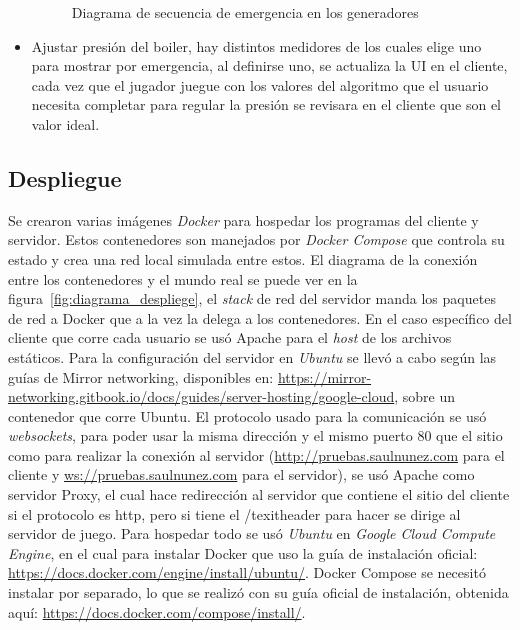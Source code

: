 \begin{itemize}
\begin{figure}[h]
            \caption{Diagrama de secuencia de emergencia en los generadores}
            \label{fig:diagrama_secuencia_generadores}
        \end{figure}
    \item Ajustar presión del boiler, hay distintos medidores de los cuales elige uno para mostrar por emergencia, al definirse uno, se actualiza la UI en el cliente, cada vez que el jugador juegue con los valores del algoritmo que el usuario necesita completar para regular la presión se revisara en el cliente que son el valor ideal.
\end{itemize}

\subsection{Despliegue}
Se crearon varias imágenes \textit{Docker} para hospedar los programas del cliente y servidor. Estos contenedores son manejados por \textit{Docker Compose} que controla su estado y crea una red local simulada entre estos. El diagrama de la conexión entre los contenedores y el mundo real se puede ver en la figura~\ref{fig:diagrama_despliege}, el \textit{stack} de red del servidor manda los paquetes de red a Docker que a la vez la delega a los contenedores.
En el caso específico del cliente que corre cada usuario se usó Apache para el \textit{host} de los archivos estáticos.
Para la configuración del servidor en \textit{Ubuntu} se llevó a cabo según las guías de Mirror networking, disponibles en: \url{https://mirror-networking.gitbook.io/docs/guides/server-hosting/google-cloud}, sobre un contenedor que corre Ubuntu.
El protocolo usado para la comunicación se usó \textit{websockets}, para poder usar la misma dirección y el mismo puerto 80 que el sitio como para realizar la conexión al servidor (\url{http://pruebas.saulnunez.com} para el cliente y \url{ws://pruebas.saulnunez.com} para el servidor), se usó Apache como servidor Proxy, el cual hace redirección al servidor que contiene el sitio del cliente si el protocolo es http, pero si tiene el /texit{header} para hacer se dirige al servidor de juego.
Para hospedar todo se usó \textit{Ubuntu} en \textit{Google Cloud Compute Engine}, en el cual para instalar Docker que uso la guía de instalación oficial: \url{https://docs.docker.com/engine/install/ubuntu/}. Docker Compose se necesitó instalar por separado, lo que se realizó con su guía oficial de instalación, obtenida aquí: \url{https://docs.docker.com/compose/install/}.

